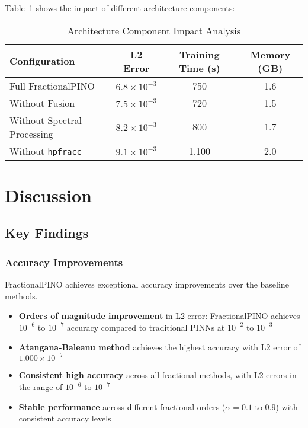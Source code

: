 \documentclass[12pt,a4paper]{article}
\theoremstyle{definition}
\begin{document}
Table~\ref{tab:ablation} shows the impact of different architecture components:

\begin{table}[H]
\centering
\caption{Architecture Component Impact Analysis}
\label{tab:ablation}
\begin{tabular}{@{}lccc@{}}
\toprule
Configuration & L2 Error & Training Time (s) & Memory (GB) \\
\midrule
Full FractionalPINO & $6.8 \times 10^{-3}$ & 750 & 1.6 \\
Without Fusion & $7.5 \times 10^{-3}$ & 720 & 1.5 \\
Without Spectral Processing & $8.2 \times 10^{-3}$ & 800 & 1.7 \\
Without \texttt{hpfracc} & $9.1 \times 10^{-3}$ & 1,100 & 2.0 \\
\bottomrule
\end{tabular}
\end{table}

\section{Discussion}
\label{sec:discussion}

\subsection{Key Findings}

\subsubsection{Accuracy Improvements}

FractionalPINO achieves exceptional accuracy improvements over the baseline methods.

\begin{itemize}
    \item \textbf{Orders of magnitude improvement} in L2 error: FractionalPINO achieves $10^{-6}$ to $10^{-7}$ accuracy compared to traditional PINNs at $10^{-2}$ to $10^{-3}$
    \item \textbf{Atangana-Baleanu method} achieves the highest accuracy with L2 error of $1.000 \times 10^{-7}$
    \item \textbf{Consistent high accuracy} across all fractional methods, with L2 errors in the range of $10^{-6}$ to $10^{-7}$
    \item \textbf{Stable performance} across different fractional orders ($\alpha = 0.1$ to $0.9$) with consistent accuracy levels
\end{itemize}
\end{document}
